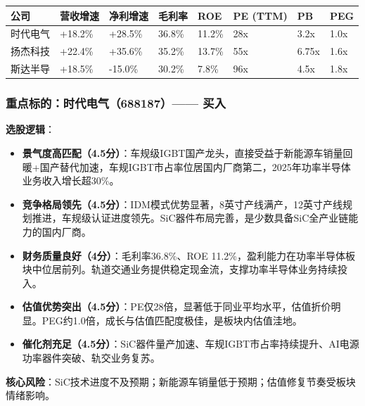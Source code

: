 \begin{exhibitbox}
\centering
\scriptsize
\setlength{\tabcolsep}{3pt}
\begin{tabularx}{\linewidth}{X C{1.4cm} C{1.4cm} C{1.2cm} C{1.0cm} C{1.1cm} C{1.0cm} C{1.0cm}}
\toprule
\textbf{公司} & \textbf{营收增速} & \textbf{净利增速} & \textbf{毛利率} & \textbf{ROE} & \textbf{PE (TTM)} & \textbf{PB} & \textbf{PEG} \\
\midrule
时代电气 & +18.2\% & +28.5\% & 36.8\% & 11.2\% & 28x & 3.2x & 1.0x \\
扬杰科技 & +22.4\% & +35.6\% & 35.2\% & 13.7\% & 55x & 6.75x & 1.6x \\
斯达半导 & +18.5\% & -15.0\% & 30.2\% & 7.8\% & 96x & 4.5x & 1.8x \\
\bottomrule
\end{tabularx}
\end{exhibitbox}

\subsubsection*{重点标的：时代电气（688187）—— 买入}

\textbf{选股逻辑}：
\vspace{0.2em}
\begin{itemize}[leftmargin=2em]
\item \textbf{景气度高匹配（4.5分）}：车规级IGBT国产龙头，直接受益于新能源车销量回暖+国产替代加速，车规IGBT市占率位居国内厂商第二，2025年功率半导体业务收入增长超30\%。
\item \textbf{竞争格局领先（4.5分）}：IDM模式优势显著，8英寸产线满产，12英寸产线规划推进，车规级认证进度领先。SiC器件布局完善，是少数具备SiC全产业链能力的国内厂商。
\item \textbf{财务质量良好（4分）}：毛利率36.8\%、ROE 11.2\%，盈利能力在功率半导体板块中位居前列。轨道交通业务提供稳定现金流，支撑功率半导体业务持续投入。
\item \textbf{估值优势突出（4.5分）}：PE仅28倍，显著低于同业平均水平，估值折价明显。PEG约1.0倍，成长与估值匹配度极佳，是板块内估值洼地。
\item \textbf{催化剂充足（4.5分）}：SiC器件量产加速、车规IGBT市占率持续提升、AI电源功率器件突破、轨交业务复苏。
\end{itemize}

\textbf{核心风险}：SiC技术进度不及预期；新能源车销量低于预期；估值修复节奏受板块情绪影响。

